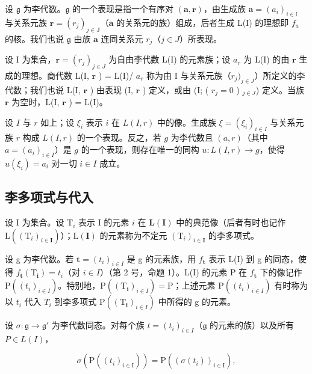 设 \(\mathfrak{g}\) 为李代数。\(\mathfrak{g}\) 的一个表现是指一个有序对 \((\boldsymbol{a},\boldsymbol{r})\)，由生成族 \(\boldsymbol{a} = (a_{i})_{i\in \mathbb{I}}\) 与关系元族 \(\boldsymbol{r} = (r_j)_{j\in \mathbb{J}}\)（\(\boldsymbol{a}\) 的关系元的族）组成，后者生成 L(I) 的理想即 \(f_{a}\) 的核。我们也说 \(\mathfrak{g}\) 由族 \(\boldsymbol{a}\) 连同关系元 \(r_j\)（\(j\in J\)）所表现。

设 I 为集合，\(\pmb{r} = (r_j)_{j \in J}\) 为自由李代数 L(I) 的元素族；设 \(a_r\) 为 L(I) 的由 \(\pmb{r}\) 生成的理想。商代数 L(I, \(\pmb{r}\) ) = L(I)/ \(a_r\) 称为由 I 与关系元族（\(r_j)_{j \in J}\)）所定义的李代数；我们也说 L(I, \(\pmb{r}\) ) 由表现 (I, \(\pmb{r}\) ) 定义，或由 (I; ( \(r_j = 0\) ) \(_{j \in J}\)) 定义。当族 \(\pmb{r}\) 为空时，L(I, \(\pmb{r}\) ) = L(I)。

设 \(I\) 与 \(r\) 如上；设 \(\xi_i\) 表示 \(i\) 在 \(L(I, r)\) 中的像。生成族 \(\xi = (\xi_i)_{i \in I}\) 与关系元族 \(r\) 构成 \(L(I, r)\) 的一个表现。反之，若 \(g\) 为李代数且 \((a, r)\)（其中 \(a = (a_i)_{i \in I}\)）是 \(g\) 的一个表现，则存在唯一的同构 \(u: L(I, r) \to g\)，使得 \(u(\xi_i) = a_i\) 对一切 \(i \in I\) 成立。

\subsection{李多项式与代入}

设 I 为集合。设 \(\mathrm{T}_i\) 表示 I 的元素 \(i\) 在 \(\mathbf{L}(\mathbf{I})\) 中的典范像（后者有时也记作 \(\mathrm{L}((\mathrm{T}_i)_{i\in \mathbf{I}})\)）；\(\mathrm{L}(\mathbf{I})\) 的元素称为不定元 \((\mathrm{T}_i)_{i\in \mathbf{I}}\) 的李多项式。

设 g 为李代数。若 \(\boldsymbol{t} = (t_{i})_{i \in I}\) 是 g 的元素族，用 \(f_{\boldsymbol{t}}\) 表示 L(I) 到 g 的同态，使得 \(f_{\boldsymbol{t}}(\mathrm{T}_{\boldsymbol{i}}) = t_{i}\)（对 \(i \in I\)）（第 2 号，命题 1）。L(I) 的元素 P 在 \(f_{\boldsymbol{t}}\) 下的像记作 \(\mathrm{P}((t_{i})_{i \in I})\)。特别地，\(\mathrm{P}((\mathrm{T}_{\boldsymbol{i}})_{i \in I}) = \mathrm{P}\)；上述元素 \(\mathrm{P}((t_{i})_{i \in I})\) 有时称为以 \(t_{i}\) 代入 \(T_{i}\) 到李多项式 \(\mathrm{P}((\mathrm{T}_{\boldsymbol{i}})_{i \in I})\) 中所得的 g 的元素。

设 \(\sigma: \mathfrak{g} \to \mathfrak{g}'\) 为李代数同态。对每个族 \(t = (t_i)_{i \in I}\)（\(\mathfrak{g}\) 的元素的族）以及所有 \(P \in L(I)\)，

\[
\sigma (\mathrm{P} ((t _ {i}) _ {i \in \mathrm{I}})) = \mathrm{P} ((\sigma (t _ {i})) _ {i \in \mathrm{I}}),\tag{4}
\]

